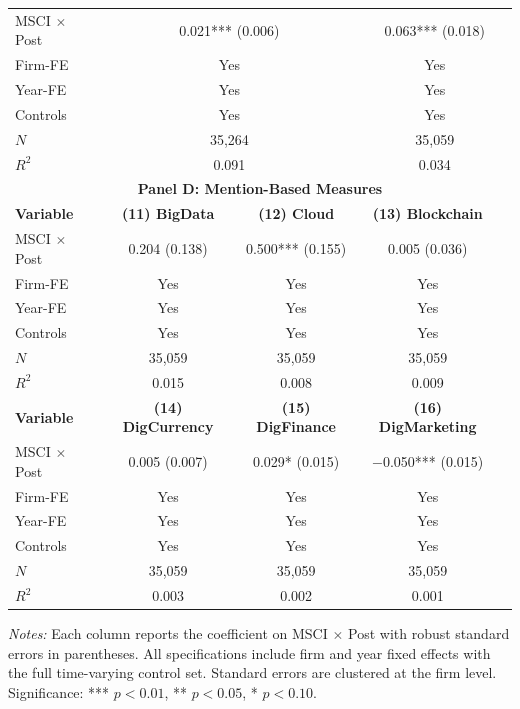 \begin{table}[htbp]
\begin{tabular}{lcccc}
\midrule
MSCI $\times$ Post & \multicolumn{2}{c}{0.021*** (0.006)} & \multicolumn{2}{c}{0.063*** (0.018)} \\
Firm-FE & \multicolumn{2}{c}{Yes} & \multicolumn{2}{c}{Yes} \\
Year-FE & \multicolumn{2}{c}{Yes} & \multicolumn{2}{c}{Yes} \\
Controls & \multicolumn{2}{c}{Yes} & \multicolumn{2}{c}{Yes} \\
$N$ & \multicolumn{2}{c}{35,264} & \multicolumn{2}{c}{35,059} \\
$R^2$ & \multicolumn{2}{c}{0.091} & \multicolumn{2}{c}{0.034} \\
\midrule
\multicolumn{5}{c}{\textbf{Panel D: Mention-Based Measures}} \\
\midrule
\textbf{Variable} & \textbf{(11) BigData} & \textbf{(12) Cloud} & \textbf{(13) Blockchain} &  \\
\midrule
MSCI $\times$ Post & 0.204 (0.138) & 0.500*** (0.155) & 0.005 (0.036) &  \\
Firm-FE & Yes & Yes & Yes &  \\
Year-FE & Yes & Yes & Yes &  \\
Controls & Yes & Yes & Yes &  \\
$N$ & 35,059 & 35,059 & 35,059 &  \\
$R^2$ & 0.015 & 0.008 & 0.009 &  \\
\addlinespace[0.2em]
\textbf{Variable} & \textbf{(14) DigCurrency} & \textbf{(15) DigFinance} & \textbf{(16) DigMarketing} &  \\
\midrule
MSCI $\times$ Post & 0.005 (0.007) & 0.029* (0.015) & $-$0.050*** (0.015) &  \\
Firm-FE & Yes & Yes & Yes &  \\
Year-FE & Yes & Yes & Yes &  \\
Controls & Yes & Yes & Yes &  \\
$N$ & 35,059 & 35,059 & 35,059 &  \\
$R^2$ & 0.003 & 0.002 & 0.001 &  \\
\bottomrule
\end{tabular}
\begin{tablenotes}
\small
\item \textit{Notes:} Each column reports the coefficient on MSCI $\times$ Post with robust standard errors in parentheses. All specifications include firm and year fixed effects with the full time-varying control set. Standard errors are clustered at the firm level. Significance: *** $p < 0.01$, ** $p < 0.05$, * $p < 0.10$.
\end{tablenotes}
\end{table}

